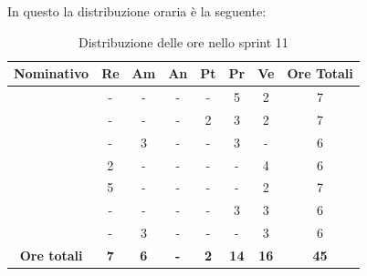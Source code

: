 In questo  la distribuzione oraria è la seguente:
\begin{table}[H]
		\begin{center}
			\setlength{\aboverulesep}{0pt}
			\setlength{\belowrulesep}{0pt}
			\setlength{\extrarowheight}{.75ex}
			\begin{tabular}{ c c c c c c c c }
				\rowcolor{AzzurroGruppo!30} 
				\textbf{Nominativo} & \textbf{Re} & \textbf{Am} & \textbf{An} & \textbf{Pt} & \textbf{Pr} & \textbf{Ve} & \textbf{Ore Totali}  \\
				\toprule
				\Davide    & - & - & - & - & 5 & 2 & 7 \\
				\Giosue    & - & - & - & 2 & 3 & 2 & 7 \\
				\Francesco & - & 3 & - & - & 3 & - & 6\\
				\Daniele   & 2 & - & - & - & - & 4 & 6\\
				\Lucrezia  & 5 & - & - & - & - & 2 & 7\\
				\Matteo    & - & - & - & - & 3 & 3 & 6\\
				\Tommaso   & - & 3 & - & - & - & 3 & 6\\
				 \textbf{Ore totali} & \textbf{7} & \textbf{6} & \textbf{-} & \textbf{2} & \textbf{14} & \textbf{16} & \textbf{45} \\
				\bottomrule
			\end{tabular}
			\caption{Distribuzione delle ore nello sprint 11}
		\end{center}
	\end{table}
	
